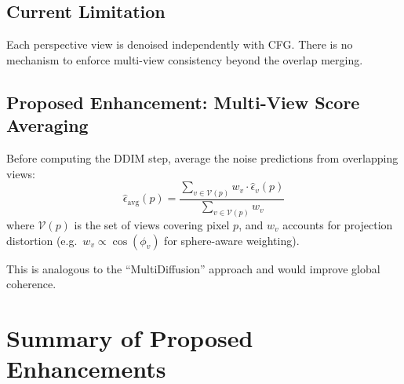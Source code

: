 \documentclass[11pt,a4paper]{article}
\begin{document}
\subsection{Current Limitation}

Each perspective view is denoised independently with CFG.
There is no mechanism to enforce multi-view consistency beyond the overlap merging.

\subsection{Proposed Enhancement: Multi-View Score Averaging}

Before computing the DDIM step, average the noise predictions from overlapping views:
\begin{equation}
    \hat{\epsilon}_{\text{avg}}(p) = \frac{\sum_{v \in \mathcal{V}(p)} w_v \cdot \hat{\epsilon}_v(p)}{\sum_{v \in \mathcal{V}(p)} w_v}
\end{equation}
where $\mathcal{V}(p)$ is the set of views covering pixel $p$, and $w_v$ accounts for projection distortion (e.g.\ $w_v \propto \cos(\phi_v)$ for sphere-aware weighting).

This is analogous to the ``MultiDiffusion'' approach and would improve global coherence.

\section{Summary of Proposed Enhancements}
\end{document}
